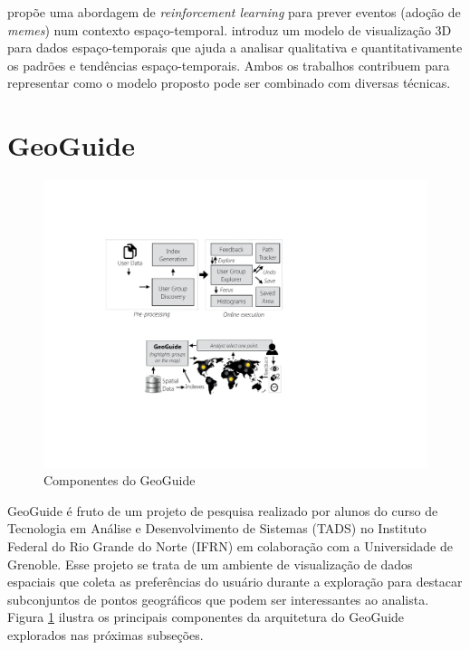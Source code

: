  propõe uma abordagem de {\em reinforcement learning} para prever eventos (adoção de {\em memes}) num contexto espaço-temporal.  introduz um modelo de visualização 3D para dados espaço-temporais que ajuda a analisar qualitativa e quantitativamente os padrões e tendências espaço-temporais. Ambos os trabalhos contribuem para representar como o modelo proposto pode ser combinado com diversas técnicas.

\section{GeoGuide}

\begin{figure}[t]
	\centering
	\includegraphics[width=\columnwidth]{imagens/framework}
	\caption{Componentes do GeoGuide}
	\label{fig:framework}
	\vspace{-10pt}
\end{figure}


GeoGuide \cite{omidvarTehrani2017} é fruto de um projeto de pesquisa realizado por alunos do curso de Tecnologia em Análise e Desenvolvimento de Sistemas (TADS) no Instituto Federal do Rio Grande do Norte (IFRN) em colaboração com a Universidade de Grenoble. Esse projeto se trata de um ambiente de visualização de dados espaciais que coleta as preferências do usuário durante a exploração para destacar subconjuntos de pontos geográficos que podem ser interessantes ao analista. Figura \ref{fig:framework} ilustra os principais componentes da arquitetura do GeoGuide explorados nas próximas subseções.

